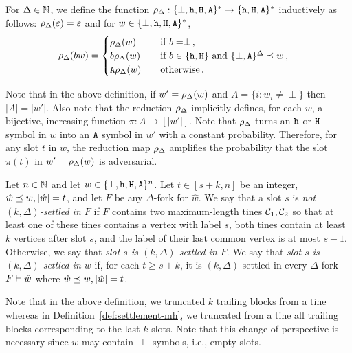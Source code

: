   \begin{definition}\label{def:reduction-map}
    For $\Delta \in \mathbb{N}$, 
    we define the function $\rho_\Delta : \{\perp, \mathtt{h}, \mathtt{H}, \mathtt{A}\}^* \rightarrow \{\mathtt{h}, \mathtt{H}, \mathtt{A}\}^*$ 
    inductively as follows: $\rho_\Delta(\varepsilon) = \varepsilon$ and 
    for $w \in \{\perp, \mathtt{h}, \mathtt{H}, \mathtt{A}\}^*$, 
    \begin{align}
      \rho_\Delta(b w) &= 
      \begin{cases}
        \rho_\Delta(w) & \quad\text{if $b = \perp$}\,, \\
        b \rho_\Delta(w) & \quad\text{if $b \in \{\mathtt{h}, \mathtt{H}\}$ and $\{\perp, \mathtt{A}\}^{\Delta} \preceq w$}\,, \\
        \mathtt{A} \rho_\Delta(w) & \quad\text{otherwise}
        \,.
      \end{cases}
    \end{align}    
  \end{definition}
  \noindent
  Note that in the above definition, 
  if $w' = \rho_\Delta(w)$ and 
  $A = \{i : w_i \neq \perp\}$ then $|A| = |w'|$. 
  Also note that 
  the reduction $\rho_\Delta$ implicitly defines, for each $w$, 
  a 
  bijective, increasing function $\pi : A \rightarrow [|w'|]$. 
  Note that 
  $\rho_\Delta$ turns an $\mathtt{h}$ or $\mathtt{H}$ symbol in $w$ 
  into an $\mathtt{A}$ symbol in $w'$ with a constant probability. 
  Therefore, for any slot $t$ in $w$, 
  the reduction map $\rho_\Delta$ 
  amplifies the probability that the slot $\pi(t)$ 
  in $w' = \rho_\Delta(w)$ is adversarial. 



  \begin{definition}\label{def:settlement-mh-delta}
    Let $n \in \mathbb{N}$ and let $w \in \{\perp, \mathtt{h}, \mathtt{H}, \mathtt{A}\}^n$. 
    Let $t \in [s + k, n]$ be an integer, $\hat{w} \preceq w, |\hat{w}| = t$, and 
    let $F$ be any $\Delta$-fork for $\hat{w}$. 
    We say that a slot $s$ is \emph{not $(k, \Delta)$-settled in $F$} 
    if $F$ contains 
    two maximum-length tines $\mathcal{C}_1, \mathcal{C}_2$ so that 
    at least one of these tines contains a vertex with label $s$,
    both tines contain at least $k$ vertices after slot $s$, and 
    the label of their last common vertex is at most $s - 1$. 
    Otherwise, we say that \emph{slot $s$ is $(k, \Delta)$-settled in $F$}. 
    We say that \emph{slot $s$ is $(k, \Delta)$-settled in $w$} if, 
    for each $t \geq s+k$, 
    it is $(k, \Delta)$-settled in every $\Delta$-fork $F \vdash \hat{w}$ 
    where $\hat{w} \preceq w, |\hat{w}| = t$.
  \end{definition}
  Note that in the above definition, 
  we truncated $k$ trailing blocks from a tine 
  whereas in Definition~\ref{def:settlement-mh}, 
  we truncated from a tine 
  all trailing blocks corresponding to the last $k$ slots. 
  Note that this change of perspective is necessary since 
  $w$ may contain $\perp$ symbols, i.e., empty slots.




